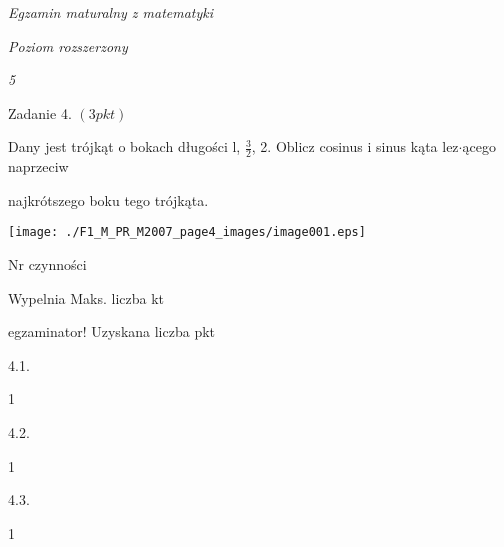 \documentclass[a4paper,12pt]{article}
\begin{document}
{\it Egzamin maturalny z matematyki}

{\it Poziom rozszerzony}

{\it 5}

Zadanie 4. $(3pkt)$

Dany jest trójkąt o bokach długości l, $\displaystyle \frac{3}{2}$, 2. Oblicz cosinus i sinus kąta lez$\cdot$ącego naprzeciw

najkrótszego boku tego trójkąta.
\begin{center}
\texttt{[image: ./F1\_M\_PR\_M2007\_page4\_images/image001.eps]}
\end{center}
Nr czynności

Wypelnia Maks. liczba kt

egzaminator! Uzyskana liczba pkt

4.1.

1

4.2.

1

4.3.

1
\end{document}

